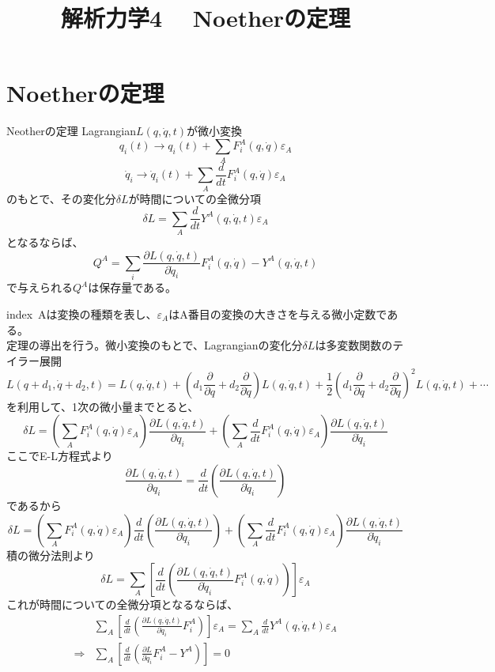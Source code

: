 \documentclass{jsarticle}
\title{解析力学4 　Noetherの定理}
\author{}
\date{}
\begin{document}
\maketitle
\noindent
\section{Noetherの定理}
\noindent
\begin{itembox}[l]{Neotherの定理}
    Lagrangian\(L(q,\dot{q},t)\)が微小変換
    \[q_{i}(t)\longrightarrow q_{i}(t)+\sum_{A}F_{i}^{A}(q,\dot{q})\varepsilon_{A}\]
    \[\dot{q}_{i}\longrightarrow \dot{q}_{i}(t)+\sum_{A}\frac{d}{dt}F_{i}^{A}(q,\dot{q})\varepsilon_{A}\]
    のもとで、その変化分\(\delta L\)が時間についての全微分項
    \[\delta L=\sum_{A}\frac{d}{dt}Y^{A}(q,\dot{q},t)\varepsilon_{A}\]
    となるならば、
    \[Q^{A}=\sum_{i}\frac{\partial L(q,\dot{q},t)}{\partial\dot{q}_{i}}F_{i}^{A}(q,\dot{q})-Y^{A}(q,\dot{q},t)\]
    で与えられる\(Q^{A}\)は保存量である。
\end{itembox}
index~Aは変換の種類を表し、\(\varepsilon_{A}\)はA番目の変換の大きさを与える微小定数である。\\
定理の導出を行う。微小変換のもとで、Lagrangianの変化分\(\delta L\)は多変数関数のテイラー展開
\[
    L(q+d_{1},\dot{q}+d_{2},t)=L(q,\dot{q},t)+
    \left(d_{1}\frac{\partial}{\partial q}+d_{2}\frac{\partial}{\partial \dot{q}}\right)L(q,\dot{q},t)+
    \frac{1}{2}\left(d_{1}\frac{\partial}{\partial q}+d_{2}\frac{\partial}{\partial\dot{q}}\right)^{2}L(q,\dot{q},t)+\cdots
\]
を利用して、1次の微小量までとると、
\[
    \delta L=\left(\sum_{A}F_{i}^{A}(q,\dot{q})\varepsilon_{A}\right)\frac{\partial L(q,\dot{q},t)}{\partial q_{i}}+
    \left(\sum_{A}\frac{d}{dt}F_{i}^{A}(q,\dot{q})\varepsilon_{A}\right)\frac{\partial L(q,\dot{q},t)}{\partial\dot{q}_{i}}
\]
ここでE-L方程式より
\[
    \frac{\partial L(q,\dot{q},t)}{\partial q_{i}}=\frac{d}{dt}\left(\frac{\partial L(q,\dot{q},t)}{\partial\dot{q}_{i}}\right)
\]
であるから
\[
    \delta L=\left(\sum_{A}F_{i}^{A}(q,\dot{q})\varepsilon_{A}\right)\frac{d}{dt}\left(\frac{\partial L(q,\dot{q},t)}
    {\partial\dot{q}_{i}}\right)+\left(\sum_{A}\frac{d}{dt}F_{i}^{A}(q,\dot{q})\varepsilon_{A}\right)
    \frac{\partial L(q,\dot{q},t)}{\partial\dot{q}_{i}}
\]  
積の微分法則より
\[
    \delta L=\sum_{A}\left[\frac{d}{dt}\left(\frac{\partial L(q,\dot{q},t)}{\partial\dot{q}_{i}}F_{i}^{A}(q,\dot{q})\right)\right]\varepsilon_{A}
\]
これが時間についての全微分項となるならば、
\begin{align*}
    &\sum_{A}\left[\frac{d}{dt}\left(\frac{\partial L(q,\dot{q},t)}{\partial\dot{q}_{i}}F_{i}^{A}\right)\right]\varepsilon_{A}
    =\sum_{A}\frac{d}{dt}Y^{A}(q,\dot{q},t)\varepsilon_{A}\\
    \Longrightarrow&\sum_{A}\left[\frac{d}{dt}\left(\frac{\partial L}{\partial\dot{q}_{i}}F_{i}^{A}-Y^{A}\right)\right]=0
\end{align*}
\end{document}
